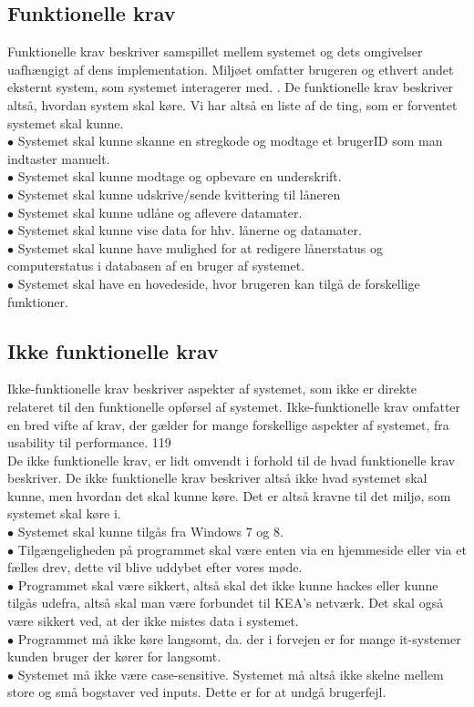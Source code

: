 \documentclass[a4paper]{article}
\begin{document}
\subsection{Funktionelle krav}
Funktionelle krav beskriver samspillet mellem systemet og dets omgivelser uafhængigt af dens implementation. Miljøet omfatter brugeren og ethvert andet eksternt system, som systemet interagerer med. \cite{OOSE}. De funktionelle krav beskriver altså, hvordan system skal køre. Vi har altså en liste af de ting, som er forventet systemet skal kunne.\\
$\bullet$ Systemet skal kunne skanne en stregkode og modtage et brugerID som man indtaster manuelt. \\
$\bullet$ Systemet skal kunne modtage og opbevare en underskrift. \\
$\bullet$ Systemet skal kunne udskrive/sende kvittering til låneren \\
$\bullet$ Systemet skal kunne udlåne og aflevere datamater. \\
$\bullet$ Systemet skal kunne vise data for hhv. lånerne og datamater. \\
$\bullet$ Systemet skal kunne have mulighed for at redigere lånerstatus og computerstatus i databasen af en bruger af systemet. \\
$\bullet$ Systemet skal have en hovedeside, hvor brugeren kan tilgå de forskellige funktioner.\\
\subsection{Ikke funktionelle krav}
Ikke-funktionelle krav beskriver aspekter af systemet, som ikke er direkte relateret til den funktionelle opførsel af systemet. Ikke-funktionelle krav omfatter en bred vifte af krav, der gælder for mange forskellige aspekter af systemet, fra usability til performance. \cite{OOSE}{119} \\ De ikke funktionelle krav, er lidt omvendt i forhold til de hvad funktionelle krav beskriver. De ikke funktionelle krav beskriver altså ikke hvad systemet skal kunne, men hvordan det skal kunne køre. Det er altså kravne til det miljø, som systemet skal køre i. \\
$\bullet$ Systemet skal kunne tilgås fra Windows 7 og 8. \\
$\bullet$ Tilgængeligheden på programmet skal være enten via en hjemmeside eller via et fælles drev, dette vil blive uddybet efter vores møde. \\
$\bullet$ Programmet skal være sikkert, altså skal det ikke kunne hackes eller kunne tilgås udefra, altså skal man være forbundet til KEA's netværk. Det skal også være sikkert ved, at der ikke mistes data i systemet. \\
$\bullet$ Programmet må ikke køre langsomt, da. der i forvejen er for mange it-systemer kunden bruger der kører for langsomt. \\
$\bullet$ Systemet må ikke være case-sensitive. Systemet må altså ikke skelne mellem store og små bogstaver ved inputs. Dette er for at undgå brugerfejl. 
\newpage
\end{document}
